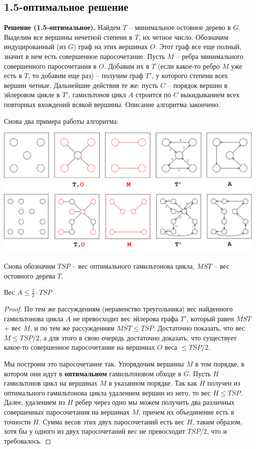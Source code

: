 \subsection{1.5-оптимальное решение}

\textbf{Решение (1.5-оптимальное).} Найдем $T$ -- минимальное остовное дерево в $G$. Выделим все вершины нечетной степени в $T$, их четное число. Обозначим индуцированный (из $G$) граф на этих вершинах $O$. Этот граф все еще полный, значит в нем есть совершенное паросочетание. Пусть $M$ -- ребра минимального совершенного паросочетания в $O$. Добавим их в $T$ (если какое-то ребро $M$ уже есть в $T$, то добавим еще раз) -- получим граф $T'$, у которого степени всех вершин четные. Дальнейшие действия те же: пусть $C$ -- порядок вершин в эйлеровом цикле в $T'$, гамильтонов цикл $A$ строится по $C$ выкидыванием всех повторных вхождений всякой вершины. Описание алгоритма закончено.

Снова два примера работы алгоритма:

\includegraphics[width=\textwidth]{figures/ex_shorthamil2.png} \\
\includegraphics[width=\textwidth]{figures/ex_longhamil2.png}

Снова обозначим $TSP$ -- вес оптимального гамильтонова цикла, $MST$ -- вес остовного дерева $T$.

\begin{theorem*} Вес $A \leq \frac{3}{2}\cdot TSP$\end{theorem*}
\begin{proof}
По тем же рассуждениям (неравенство треугольника) вес найденного гамильтонова цикла $A$ не превосходит вес эйлерова графа $T'$, который равен $MST$ $+$ вес $M$, и по тем же рассуждениям $MST \leq TSP$. Достаточно показать, что вес $M \leq TSP/2$, а для этого в свою очередь достаточно доказать, что существует какое-то совершенное паросочетание на вершинах $O$ веса $\leq TSP/2$. 

Мы построим это паросочетание так. Упорядочим вершины $M$ в том порядке, в котором они идут в \textbf{оптимальном} гамильтоновом обходе в $G$. Пусть $H$ -- гамильтонов цикл на вершинах $M$ в указанном порядке. Так как $H$ получен из оптимального гамильтонова цикла удалением вершин из него, то вес $H \leq TSP$. Далее, удалением из $H$ ребер через одно мы можем получить два различных совершенных паросочетания на вершинах $M$, причем их объединение есть в точности $H$. Сумма весов этих двух паросочетаний есть вес $H$, таким образом, хотя бы у одного из двух паросочетаний вес не превосходит $TSP/2$, что и требовалось.
\end{proof}
